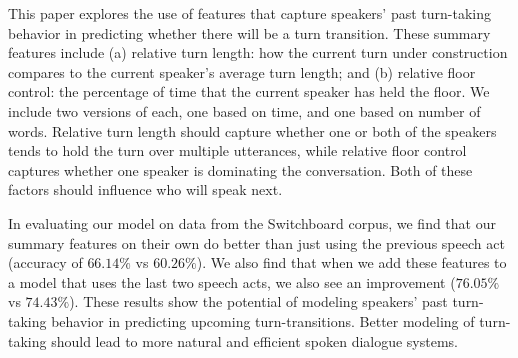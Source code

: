 This paper explores the use of features that capture speakers' past turn-taking behavior in predicting whether there will be a turn transition.  These summary features include (a) relative turn length: how the current turn under construction compares to the current speaker's average turn length; and (b) relative floor control: the percentage of time that the current speaker has held the floor.  We include two versions of each, one based on time, and one based on number of words.
%
Relative turn length should capture whether one or both of the speakers tends to hold the turn over multiple utterances, while relative floor control captures whether one speaker is dominating the conversation.  Both of these factors should influence who will speak next.

In evaluating our model on data from the Switchboard corpus, we find that our summary features on their own do better than just using the previous speech act (accuracy of $66.14\%$ vs $60.26\%$).  We also find that when we add these features to a model that uses the last two speech acts, we also see an improvement ($76.05\%$ vs $74.43\%$).  These results show the potential of modeling speakers' past turn-taking behavior in predicting upcoming turn-transitions.  Better modeling of turn-taking should lead to more natural and efficient spoken dialogue systems.
